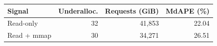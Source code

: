 \begin{tabular}{@{}lrrr@{}}
\toprule
Signal & Underalloc. & Requests (GiB) & MdAPE (\%)\\
\midrule
Read-only & 32 & 41,853 & 22.04 \\
Read + mmap & 30 & 34,271 & 26.51 \\
\bottomrule
\end{tabular}
